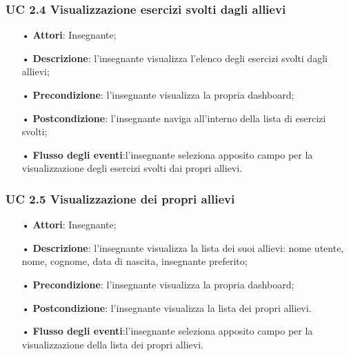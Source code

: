 \subsubsection{UC 2.4 Visualizzazione esercizi svolti dagli allievi}
\begin{itemize}
	\item[•] \textbf{Attori}: Insegnante;
	\item[•] \textbf{Descrizione}:  l’insegnante visualizza l’elenco degli esercizi svolti dagli allievi;
	\item[•] \textbf{Precondizione}: l’insegnante visualizza la propria dashboard;
	\item[•] \textbf{Postcondizione}: l’insegnante naviga all’interno della lista di esercizi svolti;
	\item[•] \textbf{Flusso degli eventi}:l'insegnante seleziona apposito campo per la visualizzazione degli esercizi svolti dai propri allievi.
\end{itemize}

\subsubsection{UC 2.5 Visualizzazione dei propri allievi}
\begin{itemize}
	\item[•] \textbf{Attori}: Insegnante;
	\item[•] \textbf{Descrizione}: l'insegnante visualizza la lista dei suoi allievi: nome utente, nome, cognome, data di nascita, insegnante preferito;
	\item[•] \textbf{Precondizione}: l'insegnante visualizza la propria dashboard;
	\item[•] \textbf{Postcondizione}: l'insegnante visualizza la lista dei propri allievi.
	\item[•] \textbf{Flusso degli eventi}:l'insegnante seleziona apposito campo per la visualizzazione della lista dei propri allievi.
\end{itemize}

